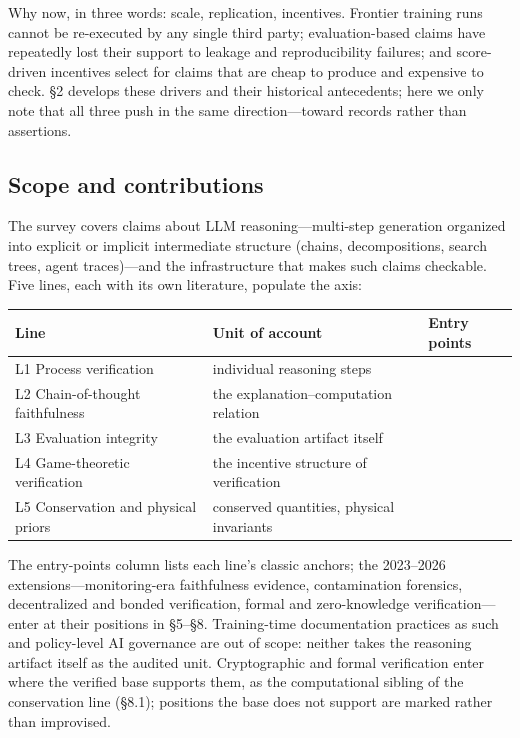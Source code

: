 \documentclass[11pt,a4paper]{article}
\begin{document}
Why now, in three words: scale, replication, incentives. Frontier training runs cannot be re-executed by any single third party; evaluation-based claims have repeatedly lost their support to leakage and reproducibility failures; and score-driven incentives select for claims that are cheap to produce and expensive to check. §2 develops these drivers and their historical antecedents; here we only note that all three push in the same direction—toward records rather than assertions.

\subsection{Scope and contributions}

The survey covers claims about LLM reasoning—multi-step generation organized into explicit or implicit intermediate structure (chains, decompositions, search trees, agent traces)—and the infrastructure that makes such claims checkable. Five lines, each with its own literature, populate the axis:

\begin{table}[htbp]
\centering
\small
\setlength{\tabcolsep}{3.5pt}
\renewcommand{\arraystretch}{1.18}
\begin{tabularx}{0.985\textwidth}{>{\raggedright\arraybackslash}p{} >{\raggedright\arraybackslash}X >{\raggedright\arraybackslash}p{}}
\toprule
\textbf{Line} & \textbf{Unit of account} & \textbf{Entry points} \\
\midrule
L1 Process verification & individual reasoning steps & \cite{key05,key06} \\
L2 Chain-of-thought faithfulness & the explanation–computation relation & \cite{key02,key03} \\
L3 Evaluation integrity & the evaluation artifact itself & \cite{key07,key08} \\
L4 Game-theoretic verification & the incentive structure of verification & \cite{key09,key10} \\
L5 Conservation and physical priors & conserved quantities, physical invariants & \cite{key11,key12,key13} \\
\bottomrule
\end{tabularx}
\end{table}

The entry-points column lists each line's classic anchors; the 2023–2026 extensions—monitoring-era faithfulness evidence, contamination forensics, decentralized and bonded verification, formal and zero-knowledge verification—enter at their positions in §5–§8. Training-time documentation practices as such and policy-level AI governance are out of scope: neither takes the reasoning artifact itself as the audited unit. Cryptographic and formal verification enter where the verified base supports them, as the computational sibling of the conservation line (§8.1); positions the base does not support are marked rather than improvised.
\end{document}
